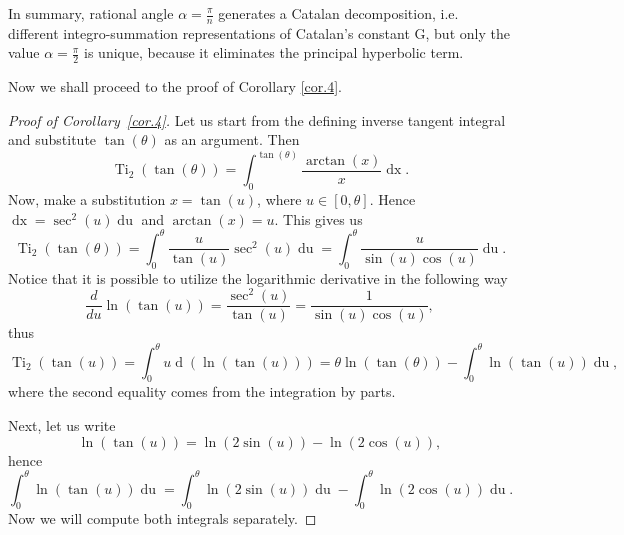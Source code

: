 \documentclass[preprint,12pt,nopreprintline]{elsarticle}
\begin{document}
In summary, rational angle $\alpha=\frac{\pi}{n}$ generates a Catalan decomposition, i.e. different integro-summation representations of Catalan’s constant G, but only the value $\alpha=\frac{\pi}{2}$ is unique, because it eliminates the principal hyperbolic term. 

Now we shall proceed to the proof of Corollary \ref{cor.4}.

\begin{proof}[Proof of Corollary~\ref{cor.4}]\normalfont
Let us start from the defining inverse tangent integral and substitute $\operatorname{tan}\left(\theta\right)$ as an argument. Then
\begin{equation}
\operatorname{Ti}_2\left(\operatorname{tan}\left(\theta\right)\right)=\int_0^{\operatorname{tan}\left(\theta\right)}\frac{\operatorname{arctan}\left(x\right)}{x}\operatorname{dx}.
\end{equation}
Now, make a substitution $x=\operatorname{tan}\left
(u\right)$, where $u\in[0,\theta]$. Hence $\operatorname{dx}=\operatorname{sec}^2\left(u\right)\operatorname{du}$ and $\operatorname{arctan}\left(x\right)=u$. This gives us
\begin{equation}
\operatorname{Ti}_2\left(\operatorname{tan}\left(\theta\right)\right)=\int_0^{\theta}\frac{u}{\operatorname{tan}\left(u\right)}\operatorname{sec}^2\left(u\right)\operatorname{du}=\int_0^{\theta}\frac{u}{\operatorname{sin}\left(u\right)\operatorname{cos}\left(u\right)}\operatorname{du}.
\end{equation}
Notice that it is possible to utilize the logarithmic derivative in the following way
\begin{equation}
\frac{d}{du}\operatorname{ln}\left(\operatorname{tan}\left(u\right)\right)=\frac{\operatorname{sec}^2\left(u\right)}{\operatorname{tan}\left(u\right)}=\frac{1}{\operatorname{sin}\left(u\right)\operatorname{cos}\left(u\right)},
\end{equation}
thus
\begin{equation}\label{eq.125}
\operatorname{Ti}_2\left(\operatorname{tan}\left(u\right)\right)=\int_0^{\theta}u\operatorname{d}\left(\operatorname{ln}\left(\operatorname{tan}\left(u\right)\right)\right)=\theta\operatorname{ln}\left(\operatorname{tan}\left(\theta\right)\right)-\int_0^{\theta}\operatorname{ln}\left(\operatorname{tan}\left(u\right)\right)\operatorname{du},
\end{equation}
where the second equality comes from the integration by parts. 

Next, let us write
\begin{equation}
\operatorname{ln}\left(\operatorname{tan}\left(u\right)\right)=\operatorname{ln}\left(2\operatorname{sin}\left(u\right)\right)-\operatorname{ln}\left(2\operatorname{cos}\left (u\right)\right),
\end{equation}
hence 
\begin{equation}
\int_0^{\theta}\operatorname{ln}\left(\operatorname{tan}\left(u\right)\right)\operatorname{du}=\int_0^{\theta}\operatorname{ln}\left(2\operatorname{sin}\left(u\right)\right)\operatorname{du}-\int_0^{\theta}\operatorname{ln}\left(2\operatorname{cos}\left(u\right)\right)\operatorname{du}.
\end{equation}
Now we will compute both integrals separately. 


\end{proof}
\end{document}
